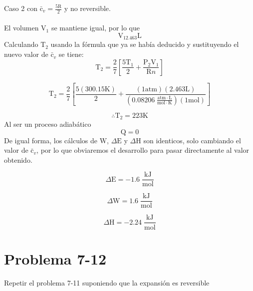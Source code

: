 \documentclass[12pt]{article}
\begin{document}
Caso 2 con $\mathrm{\bar{c}}_v=\frac{5\mathrm{R}}{2}$ y no reversible.\\
\\
El volumen $\mathrm{V}_1$ se mantiene igual, por lo que
\begin{displaymath}
	\mathrm{V}_12.463\mathrm{L}
\end{displaymath}
Calculando $\mathrm{T}_2$ usando la fórmula que ya se había deducido y sustituyendo el nuevo valor de $\mathrm{\bar{c}}_v$ se tiene:
\begin{displaymath}
	\mathrm{T}_2=\frac{2}{7}\left[ \frac{5\mathrm{T}_1}{2}+\frac{\mathrm{P}_2\mathrm{V}_1}{\mathrm{R}n} \right]
\end{displaymath}

\begin{displaymath}
	\mathrm{T}_2=\frac{2}{7}\left[ \frac{5(300.15\mathrm{K})}{2} +\frac{(1\mathrm{atm})(2.463\mathrm{L})}{(0.08206\; \frac{\mathrm{atm}\cdot\mathrm{L}}{\mathrm{mol}\cdot\mathrm{K}})(1\mathrm{mol})} \right]
\end{displaymath}

\begin{displaymath}
	\therefore \mathrm{T}_2=223\mathrm{K}
\end{displaymath}
Al ser un proceso adiabático 
\begin{displaymath}
	\mathrm{Q}=0
\end{displaymath}
De igual forma, los cálculos de $\mathrm{W}$, $\Delta\mathrm{E}$ y $\Delta\mathrm{H}$ son identicos, solo cambiando el valor de $\mathrm{\bar{c}}_v$, por lo que obviaremos el desarrollo para pasar directamente al valor obtenido.

\begin{displaymath}
	\Delta\mathrm{E}=-1.6\; \frac{\mathrm{kJ}}{\mathrm{mol}}
\end{displaymath}

\begin{displaymath}
	\Delta\mathrm{W}=1.6\; \frac{\mathrm{kJ}}{\mathrm{mol}}
\end{displaymath}

\begin{displaymath}
	\Delta\mathrm{H}=-2.24\; \frac{\mathrm{kJ}}{\mathrm{mol}}
\end{displaymath}
\newpage
\section*{Problema 7-12}
Repetir el problema 7-11 suponiendo que la expansión es reversible
\end{document}
